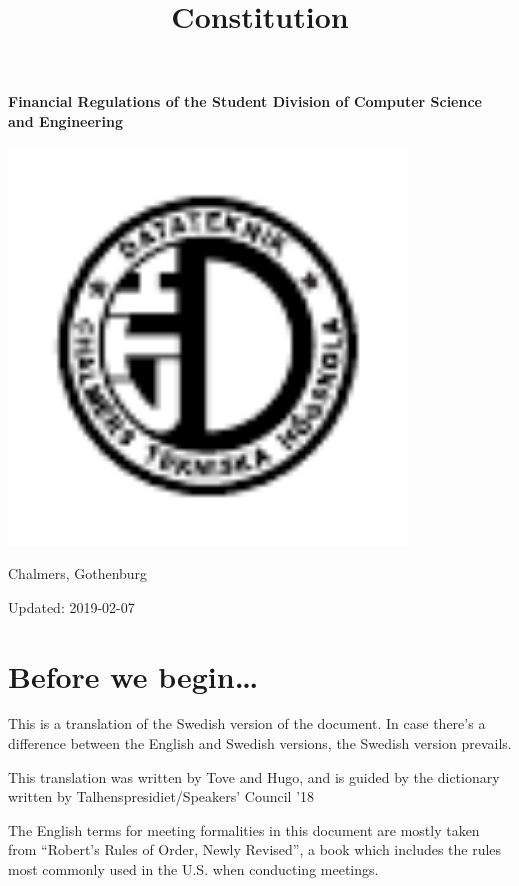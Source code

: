 \documentclass[a4paper]{dtek}
\title{Constitution}
\newcommand{\sdocsae}{Student Division of Computer Science and Engineering~}
\newcommand{\updated}{2019-02-07} %
\begin{document}
\makeheadfoot

\vspace*{\fill}
\begin{center}
{\Huge \textbf{Financial Regulations of the \sdocsae}}
\par\bigskip
\includegraphics[width=300pt]{dteklogo.pdf}
\par\bigskip
{\LARGE Chalmers, Gothenburg}
\end{center}
\vspace*{\fill}
\begin{center}
{\LARGE Updated: \updated}
\end{center}
\vspace*{\fill}


\newpage
\setcounter{tocdepth}{1}
\tableofcontents
\newpage


\setcounter{section}{-1}
\section{Before we begin\dots}
This is a translation of the Swedish version of the document. In case there's a difference between the English and Swedish versions, the Swedish version prevails.

This translation was written by Tove and Hugo, and is guided by the dictionary written by Talhenspresidiet/Speakers' Council '18

The English terms for meeting formalities in this document are mostly taken from ``Robert's Rules of Order, Newly Revised'', a book which includes the rules most commonly used in the U.S. when conducting meetings.
\end{document}
